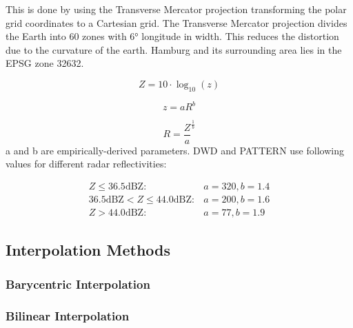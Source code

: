 \documentclass[11pt,twoside,a4paper,fleqn]{report}
\numberwithin{equation}{chapter}
\numberwithin{figure}{chapter}
\numberwithin{table}{chapter}
\begin{document}
This is done by using the Transverse Mercator projection transforming the polar grid coordinates to a Cartesian grid. The Transverse Mercator projection divides the Earth into 60 zones with  6° longitude in width. This reduces the distortion due to the curvature of the earth. Hamburg and its surrounding area lies in the EPSG zone 32632. 



\begin{equation}
	Z  = 10 \cdot \log _{10}(z)
\end{equation}

\begin{equation}
	z = aR^{b}
\end{equation}

\begin{equation}
	R = \frac{Z}{a}^{\frac{1}{b}}
\end{equation}
a and b are empirically-derived parameters. DWD and PATTERN use following values for different radar reflectivities:

\begin{equation}
	\begin{array}{lcl}
		Z \le 36.5 \text{dBZ}: & a = 320, b = 1.4 \\
		36.5 \text{dBZ} < Z \le 44.0 \text{dBZ}: & a  = 200, b = 1.6 \\
		Z > 44.0 \text{dBZ}: & a = 77, b = 1.9
	\end{array}
\end{equation}

\subsection{Interpolation Methods}
\subsubsection{Barycentric Interpolation}
\subsubsection{Bilinear Interpolation}
\begin{center}


\end{center}
\end{document}
